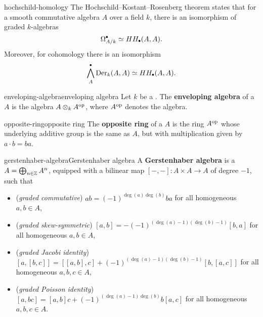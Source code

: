 \begin{example}{hochschild-homology}
    The Hochschild--Kostant--Rosenberg theorem states that for a smooth  commutative algebra $A$ over a field $k$, there is an isomorphism of graded $k$-algebras
    \[ \Omega^\bdot_{A/k} \simeq HH_\bdot(A, A) . \]
    Moreover, for cohomology there is an isomorphism
    \[ \bigwedge^\bdot_A \textup{Der}_k(A, A) \simeq HH_\bdot(A, A) . \]
\end{example}

\begin{topic}{enveloping-algebra}{enveloping algebra}
    Let $k$ be a . The \textbf{enveloping algebra} of a  $A$ is the algebra $A \otimes_k A^\textup{op}$, where $A^\textup{op}$ denotes the  algebra.
\end{topic}

\begin{topic}{opposite-ring}{opposite ring}
    The \textbf{opposite ring} of a  $A$ is the ring $A^\textup{op}$ whose underlying additive group is the same as $A$, but with multiplication given by $a \cdot b = ba$.
\end{topic}


\begin{topic}{gerstenhaber-algebra}{Gerstenhaber algebra}
    A \textbf{Gerstenhaber algebra} is a   $A = \bigoplus_{n \in \mathbb{Z}} A^n$, equipped with a bilinear map $[-, -] : A \times A \to A$ of degree $-1$, such that
    \begin{itemize}
        \item (\textit{graded commutative}) $ab = (-1)^{\deg(a) \deg(b)} ba$ for all homogeneous $a, b \in A$,
        \item (\textit{graded skew-symmetric}) $[a, b] = -(-1)^{(\deg(a) - 1)(\deg(b) - 1)} [b, a]$ for all homogeneous $a, b \in A$,
        \item (\textit{graded Jacobi identity}) $[a, [b, c]] = [[a, b], c] + (-1)^{(\deg(a) - 1)(\deg(b) - 1)} [b, [a, c]]$ for all homogeneous $a, b, c \in A$,
        \item (\textit{graded Poisson identity}) $[a, bc] = [a, b]c + (-1)^{(\deg(a) - 1) \deg(b)} b [a, c]$ for all homogeneous $a, b, c \in A$.
    \end{itemize}
\end{topic}

